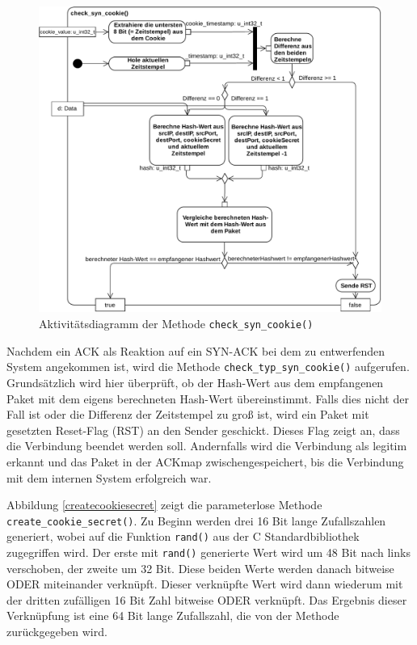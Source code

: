 \documentclass[../review_3.tex]{subfiles}
\begin{document}
\begin{figure}[t]
    \centering
    \includegraphics[width=\linewidth]{img/check_typ_syn_cookie_neu.pdf}
    \caption{Aktivitätsdiagramm der Methode \texttt{check\_syn\_cookie()}}
    \label{check_syn_cookie}
\end{figure}
Nachdem ein ACK als Reaktion auf ein SYN-ACK bei dem zu entwerfenden System angekommen ist, wird die Methode \texttt{check\_typ\_syn\_cookie()} aufgerufen.
Grundsätzlich wird hier überprüft, ob der Hash-Wert aus dem empfangenen Paket mit dem eigens berechneten Hash-Wert übereinstimmt. Falls dies nicht der Fall ist oder die Differenz der Zeitstempel zu groß ist, wird ein Paket mit gesetzten Reset-Flag (RST) an den Sender geschickt. Dieses Flag zeigt an, dass die Verbindung beendet werden soll. Andernfalls wird die Verbindung als legitim erkannt und das Paket in der ACKmap zwischengespeichert, bis die Verbindung mit dem internen System erfolgreich war.

Abbildung \ref{createcookiesecret} zeigt die parameterlose Methode \texttt{create\_cookie\_secret()}. Zu Beginn werden drei 16 Bit lange Zufallszahlen generiert, wobei auf die Funktion \texttt{rand()} aus der C Standardbibliothek zugegriffen wird. Der erste mit \texttt{rand()} generierte Wert wird um 48 Bit nach links verschoben, der zweite um 32 Bit. Diese beiden Werte werden danach bitweise ODER miteinander verknüpft. Dieser verknüpfte Wert wird dann wiederum mit der dritten zufälligen 16 Bit Zahl bitweise ODER verknüpft. Das Ergebnis dieser Verknüpfung ist eine 64 Bit lange Zufallszahl, die von der Methode zurückgegeben wird.
\end{document}
